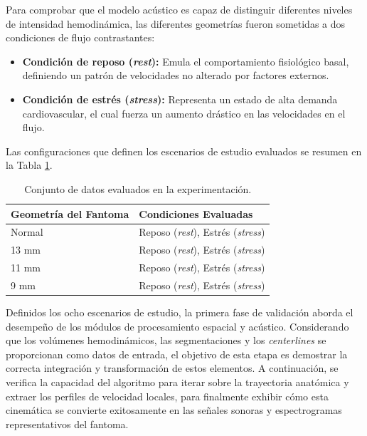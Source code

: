 Para comprobar que el modelo acústico es capaz de distinguir diferentes niveles de intensidad hemodinámica, las diferentes geometrías fueron sometidas a dos condiciones de flujo contrastantes:


\begin{itemize}
    \item \textbf{Condición de reposo (\textit{rest}):} Emula el comportamiento fisiológico basal, definiendo un patrón de velocidades no alterado por factores externos.
    
    \item \textbf{Condición de estrés (\textit{stress}):} Representa un estado de alta demanda cardiovascular, el cual fuerza un aumento drástico en las velocidades en el flujo.
\end{itemize}

Las configuraciones que definen los escenarios de estudio evaluados se resumen en la Tabla \ref{table:casos_estudio}.

\begin{table}[h]
    \centering
    \caption{\label{table:casos_estudio} Conjunto de datos evaluados en la experimentación.}
    \begin{tabular}{|l|l|}
        \hline
        \textbf{Geometría del Fantoma} & \textbf{Condiciones Evaluadas} \\
        \hline
        Normal & Reposo (\textit{rest}), Estrés (\textit{stress}) \\
        \hline
        13 mm & Reposo (\textit{rest}), Estrés (\textit{stress}) \\
        \hline
        11 mm & Reposo (\textit{rest}), Estrés (\textit{stress}) \\
        \hline
        9 mm & Reposo (\textit{rest}), Estrés (\textit{stress}) \\
        \hline
    \end{tabular}
\end{table}


Definidos los ocho escenarios de estudio, la primera fase de validación aborda el desempeño de los módulos de procesamiento espacial y acústico. Considerando que los volúmenes hemodinámicos, las segmentaciones y los \textit{centerlines} se proporcionan como datos de entrada, el objetivo de esta etapa es demostrar la correcta integración y transformación de estos elementos. A continuación, se verifica la capacidad del algoritmo para iterar sobre la trayectoria anatómica y extraer los perfiles de velocidad locales, para finalmente exhibir cómo esta cinemática se convierte exitosamente en las señales sonoras y espectrogramas representativos del fantoma.

